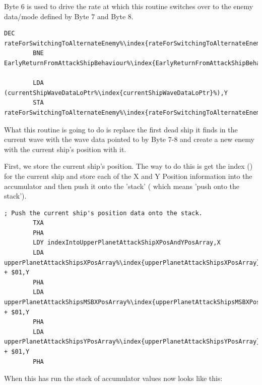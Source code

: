 Byte 6 is used to drive the rate at which this routine switches over to the enemy data/mode defined by Byte 7 and Byte 8.

\begin{lstlisting}[caption=\icode{rateForSwitchingToAlternateEnemy\index{rateForSwitchingToAlternateEnemy}} (Byte 6) is decremented and reloaded each time it reaches zero. ,escapechar=\%]
        DEC rateForSwitchingToAlternateEnemy%\index{rateForSwitchingToAlternateEnemy}%,X
        BNE EarlyReturnFromAttackShipBehaviour%\index{EarlyReturnFromAttackShipBehaviour}%

        LDA (currentShipWaveDataLoPtr%\index{currentShipWaveDataLoPtr}%),Y
        STA rateForSwitchingToAlternateEnemy%\index{rateForSwitchingToAlternateEnemy}%,X
\end{lstlisting}

What this routine is going to do is replace the first dead ship it finds in the current wave with the wave data pointed to by  Byte 7-8
and create a new enemy with the current ship's position with it.

First, we store the current ship's position. The way to do this is get the index () for the current ship  and store
each of the X and Y Position information into the accumulator  and then push it onto the 'stack' ( which means
'push  onto the stack').

\begin{lstlisting}[escapechar=\%]
        ; Push the current ship's position data onto the stack.
        TXA
        PHA
        LDY indexIntoUpperPlanetAttackShipXPosAndYPosArray,X
        LDA upperPlanetAttackShipsXPosArray%\index{upperPlanetAttackShipsXPosArray}% + $01,Y
        PHA
        LDA upperPlanetAttackShipsMSBXPosArray%\index{upperPlanetAttackShipsMSBXPosArray}% + $01,Y
        PHA
        LDA upperPlanetAttackShipsYPosArray%\index{upperPlanetAttackShipsYPosArray}% + $01,Y
        PHA
\end{lstlisting}

When this has run the stack of accumulator values now looks like this:

